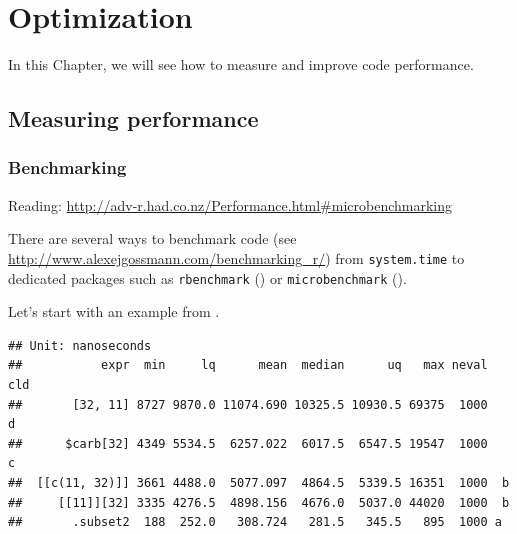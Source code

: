 \documentclass[]{book}
\newenvironment{Shaded}{\begin{snugshade}}{\end{snugshade}}
\newcommand{\KeywordTok}[1]{\textcolor[rgb]{0.13,0.29,0.53}{\textbf{#1}}}
\newcommand{\DataTypeTok}[1]{\textcolor[rgb]{0.13,0.29,0.53}{#1}}
\newcommand{\DecValTok}[1]{\textcolor[rgb]{0.00,0.00,0.81}{#1}}
\newcommand{\StringTok}[1]{\textcolor[rgb]{0.31,0.60,0.02}{#1}}
\newcommand{\CommentTok}[1]{\textcolor[rgb]{0.56,0.35,0.01}{\textit{#1}}}
\newcommand{\OperatorTok}[1]{\textcolor[rgb]{0.81,0.36,0.00}{\textbf{#1}}}
\newcommand{\NormalTok}[1]{#1}
\theoremstyle{definition}
\theoremstyle{definition}
\theoremstyle{definition}
\theoremstyle{remark}
\begin{document}
\chapter{Optimization}\label{optimization}

In this Chapter, we will see how to measure and improve code
performance.

\section{Measuring performance}\label{measuring-performance}

\subsection{Benchmarking}\label{benchmarking}

Reading:
\url{http://adv-r.had.co.nz/Performance.html\#microbenchmarking}

There are several ways to benchmark code (see
\url{http://www.alexejgossmann.com/benchmarking_r/}) from
\texttt{system.time} to dedicated packages such as \texttt{rbenchmark}
(\citet{rbenchmark}) or \texttt{microbenchmark}
(\citet{microbenchmark}).

Let's start with an example from \citet{Wickham2014}.

\begin{Shaded}
\end{Shaded}

\begin{verbatim}
## Unit: nanoseconds
##           expr  min     lq      mean  median      uq   max neval  cld
##       [32, 11] 8727 9870.0 11074.690 10325.5 10930.5 69375  1000    d
##      $carb[32] 4349 5534.5  6257.022  6017.5  6547.5 19547  1000   c 
##  [[c(11, 32)]] 3661 4488.0  5077.097  4864.5  5339.5 16351  1000  b  
##     [[11]][32] 3335 4276.5  4898.156  4676.0  5037.0 44020  1000  b  
##       .subset2  188  252.0   308.724   281.5   345.5   895  1000 a
\end{verbatim}
\end{document}
